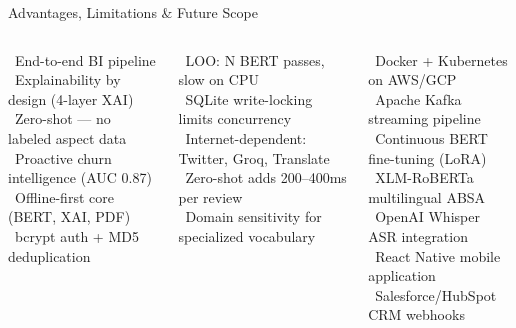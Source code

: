 \documentclass[aspectratio=169]{beamer}
\begin{document}
\begin{frame}{Advantages, Limitations \& Future Scope}
  \begin{columns}[T]
      \begin{tcolorbox}[colback=posgreen!10, colframe=posgreen!60!black, arc=5pt,
                        title={\small\bfseries\faThumbsUp\ Key Advantages},
                        fonttitle=\color{white}, colbacktitle=posgreen!60!black]
        \scriptsize
        \faCheckCircle\ End-to-end BI pipeline\\[3pt]
        \faCheckCircle\ Explainability by design (4-layer XAI)\\[3pt]
        \faCheckCircle\ Zero-shot --- no labeled aspect data\\[3pt]
        \faCheckCircle\ Proactive churn intelligence (AUC 0.87)\\[3pt]
        \faCheckCircle\ Offline-first core (BERT, XAI, PDF)\\[3pt]
        \faCheckCircle\ bcrypt auth + MD5 deduplication
      \end{tcolorbox}
      \begin{tcolorbox}[colback=negred!10, colframe=negred, arc=5pt,
                        title={\small\bfseries\faExclamationTriangle\ Limitations},
                        fonttitle=\color{white}, colbacktitle=negred]
        \scriptsize
        \faTimes\ LOO: N BERT passes, slow on CPU\\[3pt]
        \faTimes\ SQLite write-locking limits concurrency\\[3pt]
        \faTimes\ Internet-dependent: Twitter, Groq, Translate\\[3pt]
        \faTimes\ Zero-shot adds 200--400ms per review\\[3pt]
        \faTimes\ Domain sensitivity for specialized vocabulary
      \end{tcolorbox}
      \begin{tcolorbox}[colback=accentblue!10, colframe=accentblue, arc=5pt,
                        title={\small\bfseries\faRocket\ Future Scope},
                        fonttitle=\color{white}, colbacktitle=accentblue]
        \scriptsize
        \faCloud\ Docker + Kubernetes on AWS/GCP\\[3pt]
        \faBolt\ Apache Kafka streaming pipeline\\[3pt]
        \faSync\ Continuous BERT fine-tuning (LoRA)\\[3pt]
        \faGlobe\ XLM-RoBERTa multilingual ABSA\\[3pt]
        \faMicrophone\ OpenAI Whisper ASR integration\\[3pt]
        \faMobileAlt\ React Native mobile application\\[3pt]
        \faLink\ Salesforce/HubSpot CRM webhooks
      \end{tcolorbox}
  \end{columns}
\end{frame}
\end{document}
